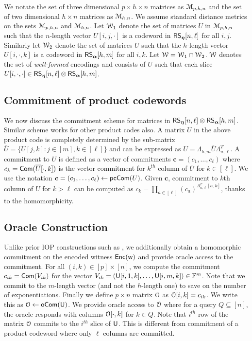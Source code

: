 We notate the set of three dimensional $p\times h\times n$ matrices as $\mathcal{M}_{p,h,n}$ and the set of two dimensional $h\times n$ matrices as $\mathcal{M}_{h, n}$. We assume standard distance metrics on the sets $\mathcal{M}_{p,h,n}$ and $\mathcal{M}_{h,n}$. Let $\mathcal{W}_1$ denote the set of matrices $U$ in $\mathcal{M}_{p,h,n}$ such that the $n$-length vector $U[i,j,\cdot]$ is a
codeword in $\mathsf{RS}_{\bm{\eta}}[n,\ell]$ for all $i,j$. Similarly let $\mathcal{W}_2$ denote the set of matrices $U$ such that the $h$-length vector $U[i,\cdot,k]$ is a codeword in
$\mathsf{RS}_{\bm{\alpha}}[h,m]$ for all $i,k$.  Let $\mathcal{W}=\mathcal{W}_1\cap \mathcal{W}_2$. $\mathcal{W}$ denotes the set of {\em well-formed} encodings  and consists of $U$ such that each slice $U[i,\cdot,\cdot]\in \mathsf{RS}_{\bm{\eta}}[n,\ell]\otimes \mathsf{RS}_{\bm{\alpha}}[h,m]$. 

\subsection{Commitment of product codewords}\label{subsec:matrixcommitment}
We now discuss the commitment scheme for matrices in $\mathsf{RS}_{\bm{\eta}}[n,\ell] \otimes \mathsf{RS}_{\bm{\alpha}}[h,m]$. Similar scheme works for other product codes also. A matrix $U$ in the above product code is completely determined by the sub-matrix $\overline{U}=\{U[j,k]: j\in [m], k\in [\ell]\}$ and can be expressed as $U=\Lambda_{h,m}\overline{U}\Lambda_{n,\ell}^T$. 
A commitment to $U$ is defined as  a vector of commitments $\bm{c}=(c_1,\ldots,c_\ell)$ where $c_k=\mathsf{Com}(\overline{U}[\cdot,k])$ is the vector commitment for $k^{th}$ column of $\overline{U}$ for $k\in [\ell]$. We use the notation $\bm{c} = (c_1,\ldots,c_\ell) \leftarrow \mathsf{pcCom}(U)$. Given $\bm{c}$, commitment to $k$th column of $U$ for $k > \ell$ 
can be computed as  $c_k=\prod_{a\in [\ell]}(c_a)^{\Lambda_{n,\ell}^T[a,k]}$, thanks to the homomorphicity. 

\subsection{Oracle Construction}\label{subsec:construct_oracle}
Unlike prior IOP constructions such as \cite{ligero, aurora}, we additionally obtain a homomorphic commitment on the encoded witness $\mathsf{Enc}(\mathsf{w})$ and provide oracle access to the commitment. For all $(i,k)\in [p]\times [n]$, we compute the commitment $c_{ik}=\mathsf{Com}(V_{ik})$ for the vector $V_{ik}=(\mathsf{U}[i,1,k],\ldots,\mathsf{U}[i,m,k])\in \mathbb{F}^m$. Note that we commit to the $m$-length vector (and not the $h$-length one)  to save on the number of exponentiations. 
Finally we define $p\times n$ matrix $\mathcal{O}$ as $\mathcal{O}[i,k]=c_{ik}$. We write this as $\mathcal{O} \leftarrow \mathsf{oCom}(\mathsf{U})$. We provide oracle access to $\mathcal{O}$ where for a
query $Q\subseteq [n]$, the oracle responds with columns $\mathcal{O}[\cdot,k]$ for $k\in Q$. Note that $i^{th}$ row of the matrix $\mathcal{O}$ commits to the $i^{th}$ slice of $\mathsf{U}$. This is different from  commitment of a product codeword where only $\ell$ columns are committed.

